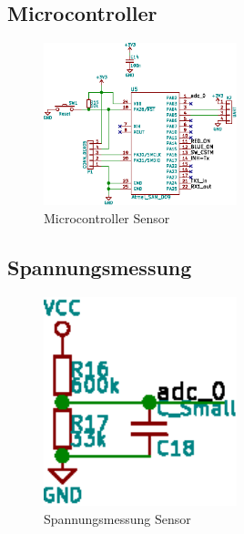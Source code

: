 

\subsection{Microcontroller}
\label{subsec:hw:sensor:mcu}

\begin{figure}[h!t]
    \centering
    \includegraphics[width=0.5\textwidth]{images/sensor-sch/sensor--sch--mcu.eps}
    \caption[Sensor: Schema Microcontroller]{Microcontroller Sensor}
\end{figure}


\subsection{Spannungsmessung}
\label{subsec:hw:sensor:voltageSense}

\begin{figure}[h!t]
    \centering
    \includegraphics[width=0.5\textwidth]{images/sensor-sch/sensor--sch--sensor.eps}
    \caption[Sensor: Schema Spannungsmessung]{Spannungsmessung Sensor}
\end{figure}

